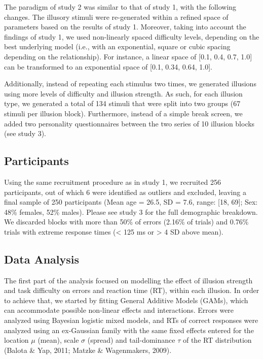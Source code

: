 \documentclass[
  man,floatsintext]{apa6}
\begin{document}
The paradigm of study 2 was similar to that of study 1, with the following changes. The illusory stimuli were re-generated within a refined space of parameters based on the results of study 1. Moreover, taking into account the findings of study 1, we used non-linearly spaced difficulty levels, depending on the best underlying model (i.e., with an exponential, square or cubic spacing depending on the relationship). For instance, a linear space of {[}0.1, 0.4, 0.7, 1.0{]} can be transformed to an exponential space of {[}0.1, 0.34, 0.64, 1.0{]}.

Additionally, instead of repeating each stimulus two times, we generated illusions using more levels of difficulty and illusion strength. As such, for each illusion type, we generated a total of 134 stimuli that were split into two groups (67 stimuli per illusion block). Furthermore, instead of a simple break screen, we added two personality questionnaires between the two series of 10 illusion blocks (see study 3).

\hypertarget{participants-1}{%
\subsection{Participants}\label{participants-1}}

Using the same recruitment procedure as in study 1, we recruited 256 participants, out of which 6 were identified as outliers and excluded, leaving a final sample of 250 participants (Mean age = 26.5, SD = 7.6, range: {[}18, 69{]}; Sex: 48\% females, 52\% males). Please see study 3 for the full demographic breakdown. We discarded blocks with more than 50\% of errors (2.16\% of trials) and 0.76\% trials with extreme response times (\textless{} 125 ms or \textgreater{} 4 SD above mean).

\hypertarget{data-analysis-1}{%
\subsection{Data Analysis}\label{data-analysis-1}}

The first part of the analysis focused on modelling the effect of illusion strength and task difficulty on errors and reaction time (RT), within each illusion. In order to achieve that, we started by fitting General Additive Models (GAMs), which can accommodate possible non-linear effects and interactions. Errors were analyzed using Bayesian logistic mixed models, and RTs of correct responses were analyzed using an ex-Gaussian family with the same fixed effects entered for the location \(\mu\) (mean), scale \(\sigma\) (spread) and tail-dominance \(\tau\) of the RT distribution (Balota \& Yap, 2011; Matzke \& Wagenmakers, 2009).
\end{document}
